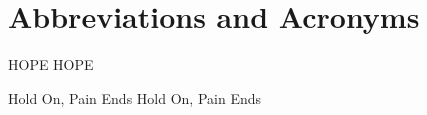 \chapter{Abbreviations and Acronyms}\label{chapter:abbreviations}

\begin{multicols}{2}
\setlength{\parindent}{0pt}
	HOPE
	\hfill \break
	HOPE

\columnbreak

	Hold On, Pain Ends
 	\hfill \break
	Hold On, Pain Ends

\end{multicols}